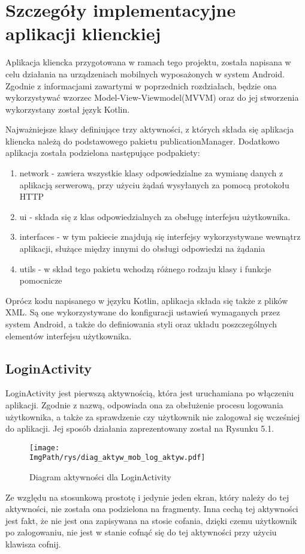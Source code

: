 \documentclass[a4paper,12pt,twoside,openany]{report}
\newcommand{\ImgPath}{.}
\begin{document}
\chapter{Szczegóły implementacyjne aplikacji klienckiej}

Aplikacja kliencka przygotowana w ramach tego projektu, została napisana w celu działania na urządzeniach mobilnych wyposażonych w system Android. Zgodnie z informacjami zawartymi w poprzednich rozdziałach, będzie ona wykorzystywać wzorzec Model-View-Viewmodel(MVVM) oraz do jej stworzenia wykorzystany został język Kotlin. 

Najważniejsze klasy definiujące trzy aktywności, z których składa się aplikacja kliencka należą do podstawowego pakietu publicationManager.
Dodatkowo aplikacja została podzielona następujące podpakiety:
\begin{enumerate}
 	\item network - zawiera wszystkie klasy odpowiedzialne za wymianę danych z aplikacją serwerową, przy użyciu żądań wysyłanych za pomocą protokołu HTTP
 	\item ui - składa się z klas odpowiedzialnych za obsługę interfejsu użytkownika.
 	\item interfaces - w tym pakiecie znajdują się interfejsy wykorzystywane wewnątrz aplikacji, służące między innymi do obsługi odpowiedzi na żądania
 	\item utils - w skład tego pakietu wchodzą różnego rodzaju klasy i funkcje pomocnicze
\end{enumerate}

Oprócz kodu napisanego w języku Kotlin, aplikacja składa się także z plików XML. Są one wykorzystywane do konfiguracji ustawień wymaganych przez system Android, a także do definiowania styli oraz układu poszczególnych elementów interfejsu użytkownika. 

\section{LoginActivity}
LoginActivity jest pierwszą aktywnością, która jest uruchamiana po włączeniu aplikacji. Zgodnie z nazwą, odpowiada ona za obsłużenie procesu logowania użytkownika, a także za sprawdzenie czy użytkownik nie zalogował się wcześniej do aplikacji. Jej sposób działania zaprezentowany został na Rysunku 5.1.
\begin{figure}[!htbp]
	\begin{center}
		\centering
		\texttt{[image: \\ImgPath/rys/diag\_aktyw\_mob\_log\_aktyw.pdf]}
	\end{center}
	\caption{Diagram aktywności dla LoginActivity}
	\label{diagramAktywnosciLoginActivity}
\end{figure}
\pagebreak
Ze względu na stosunkową prostotę i jedynie jeden ekran, który należy do tej aktywności, nie została ona podzielona na fragmenty. Inna cechą tej aktywności jest fakt, że nie jest ona zapisywana na stosie cofania, dzięki czemu użytkownik po zalogowaniu, nie jest w stanie cofnąć się do tej aktywności przy użyciu klawisza cofnij.
\end{document}
